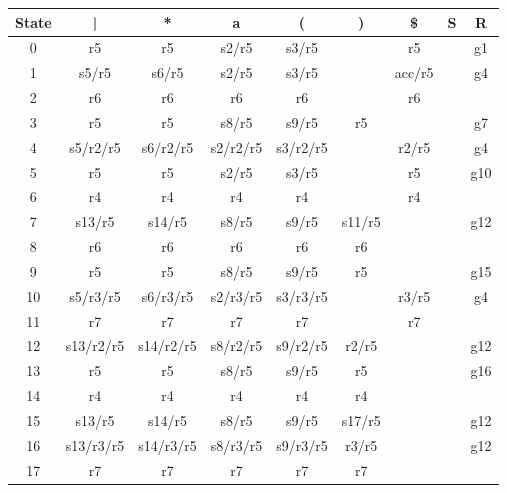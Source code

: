 \begin{center}
    \begin{latin}
    \begin{tabular}{|c|c|c|c|c|c|c|c|c|}
    \hline
    State  & |        & *        & a        & (        & )        & \$        & S        & R \\ \hline
    0      & r5       & r5       &s2/r5     &s3/r5     &          &r5         &          & g1\\ \hline
    1      &s5/r5     &s6/r5     &s2/r5     &s3/r5     &          &acc/r5     &          & g4\\ \hline
    2      &r6        &r6        &r6        &r6        &          &r6         &          &   \\ \hline
    3      &r5        &r5        &s8/r5     &s9/r5     &r5        &           &          & g7\\ \hline
    4      &s5/r2/r5  &s6/r2/r5  &s2/r2/r5  &s3/r2/r5  &          &r2/r5      &          & g4\\ \hline
    5      &r5        &r5        &s2/r5     &s3/r5     &          &r5         &          &g10\\ \hline
    6      &r4        &r4        &r4        &r4        &          &r4         &          &   \\ \hline
    7      &s13/r5    &s14/r5    &s8/r5     &s9/r5     &s11/r5    &           &          &g12\\ \hline
    8      &r6        &r6        &r6        &r6        &r6        &           &          &   \\ \hline
    9      &r5        &r5        &s8/r5     &s9/r5     &r5        &           &          &g15\\ \hline
    10     &s5/r3/r5  &s6/r3/r5  &s2/r3/r5  &s3/r3/r5  &          &r3/r5      &          & g4\\ \hline
    11     &r7        &r7        &r7        &r7        &          &r7         &          &   \\ \hline
    12     &s13/r2/r5 &s14/r2/r5 &s8/r2/r5  &s9/r2/r5  &r2/r5     &           &          &g12\\ \hline
    13     &r5        &r5        &s8/r5     &s9/r5     &r5        &           &          &g16\\ \hline
    14     &r4        &r4        &r4        &r4        &r4        &           &          &   \\ \hline
    15     &s13/r5    &s14/r5    &s8/r5     &s9/r5     &s17/r5    &           &          &g12\\ \hline
    16     &s13/r3/r5 &s14/r3/r5 &s8/r3/r5  &s9/r3/r5  &r3/r5     &           &          &g12\\ \hline
    17     &r7        &r7        &r7        &r7        &r7        &           &          &   \\ \hline
    \end{tabular}
    \end{latin}
\end{center}

